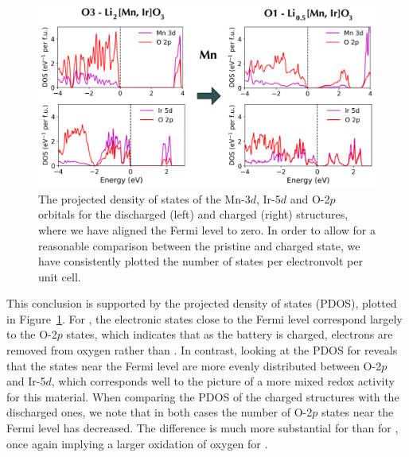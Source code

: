 \begin{refsection}
\begin{figure}[ht] 
\centering 
\captionsetup{width=0.9\linewidth}
\includegraphics[width=\textwidth]{Figures/batteries/charge_pdos_Mn_Ir.png} 
\caption{The projected density of states of the Mn-3$d$, Ir-5$d$ and O-2$p$ 
orbitals for the discharged (left) and charged (right) structures, where we 
have aligned the Fermi level to zero. In order to allow for a reasonable 
comparison between the pristine and charged state, we have consistently 
plotted the number of states per electronvolt per unit cell.} 
\label{batteries:fig-charge_pdos_Mn_Ir} 
\end{figure} 
 
This conclusion is supported by the projected density of states (PDOS), 
plotted in Figure~\ref{batteries:fig-charge_pdos_Mn_Ir}. For , the 
electronic states close to the Fermi level correspond largely to the O-2$p$ 
states, which indicates that as the battery is charged, electrons are removed 
from oxygen rather than . In contrast, looking at the PDOS for 
 reveals that the states near the Fermi level are more evenly 
distributed between O-2$p$ and Ir-5$d$, which corresponds well to the picture 
of a more mixed redox activity for this material. When comparing the PDOS of 
the charged structures with the discharged ones, we note that in both cases 
the number of O-2$p$ states near the Fermi level has decreased. The difference 
is much more substantial for  than for , once again 
implying a larger oxidation of oxygen for . 
 
 

\end{refsection}

